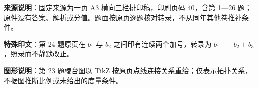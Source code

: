 


\begin{gktip}
\textbf{来源说明}：固定来源为一页 A3 横向三栏排印稿，印刷页码 40，含第 1—26 题；原件没有答案、解析或分值。题面按原页逐题核对转录，不从同年其他卷推补条件。

\textbf{特殊印文}：第 24 题原页在 $b_1$ 与 $b_2$ 之间印有连续两个加号，转录为 \texttt{$b_1 + +b_2 + b_3$}，照录而不静默改正。

\textbf{图形说明}：第 23 题棱台图以 TikZ 按原页点线连接关系重绘；仅表示拓扑关系，不据图推断比例或未给出的度量条件。
\end{gktip}

